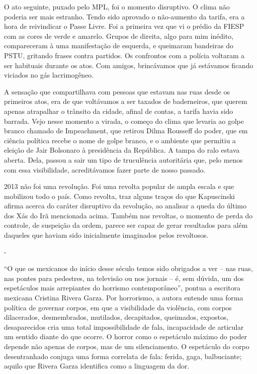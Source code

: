 O ato seguinte, puxado pelo MPL, foi o momento disruptivo. O clima não
poderia ser mais estranho. Tendo sido aprovado o não-aumento da tarifa,
era a hora de reivindicar o Passe Livre. Foi a primeira vez que vi o
prédio da FIESP com as cores de verde e amarelo. Grupos de direita, algo
para mim inédito, compareceram à uma manifestação de esquerda, e
queimaram bandeiras do PSTU, gritando frases contra partidos. Os
confrontos com a polícia voltaram a ser habituais durante os atos. Com
amigos, brincávamos que já estávamos ficando viciados no gás
lacrimogêneo.

A sensação que compartilhava com pessoas que estavam nas ruas desde os
primeiros atos, era de que voltávamos a ser taxados de baderneiros, que
querem apenas atrapalhar o trânsito da cidade, afinal de contas, a
tarifa havia sido barrada. Vejo nesse momento a virada, o começo do
clima que levaria ao golpe branco chamado de Impeachment, que retirou
Dilma Rousseff do poder, que em ciência política recebe o nome de golpe
branco, e o ambiente que permitiu a eleição de Jair Bolsonaro à
presidência da República. A tampa do ralo estava aberta. Dela, passou a
sair um tipo de truculência autoritária que, pelo menos com essa
visibilidade, acreditávamos fazer parte de nosso passado.

2013 não foi uma revolução. Foi uma revolta popular de ampla escala e
que mobilizou todo o país. Como revolta, traz alguns traços do que
Kapuscinski afirma acerca do caráter disruptivo da revolução, ao
analisar a queda do último dos Xás do Irã mencionada acima. Também nas
revoltas, o momento de perda do controle, de suspeição da ordem, parece
ser capaz de gerar resultados para além daqueles que haviam sido
inicialmente imaginados pelos revoltosos.

-

``O que os mexicanos do início desse século temos sido obrigados a ver
-- nas ruas, nas pontes para pedestres, na televisão ou nos jornais --
é, sem dúvida, um dos espetáculos mais arrepiantes do horrismo
contemporâneo'', pontua a escritora mexicana Cristina Rivera Garza. Por
horrorismo, a autora entende uma forma política de governar corpos, em
que a visibilidade da violência, com corpos dilacerados, desmembrados,
mutilados, decapitados, queimados, expostos, desaparecidos cria uma
total impossibilidade de fala, incapacidade de articular um sentido
diante do que ocorre. O horror como o espetáculo máximo do poder depende
não apenas de corpos, mas de um silenciamento. O espetáculo do corpo
desentranhado conjuga uma forma correlata de fala: ferida, gaga,
balbuciante; aquilo que Rivera Garza identifica como a linguagem da dor.


